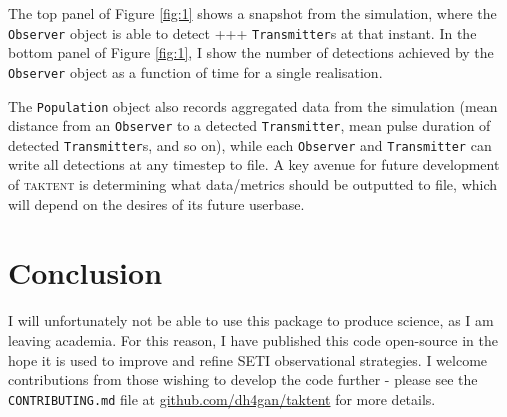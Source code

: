 \documentclass[RNAAS]{aastex62}
\begin{document}
The top panel of Figure \ref{fig:1} shows a snapshot from the simulation, where the \texttt{Observer} object is able to detect  +++ \texttt{Transmitter}s at that instant.  In the bottom panel of Figure \ref{fig:1}, I show the number of detections achieved by the \texttt{Observer} object as a function of time for a single realisation.  

The \texttt{Population} object also records aggregated data from the simulation (mean distance from an \texttt{Observer} to a detected \texttt{Transmitter}, mean pulse duration of detected \texttt{Transmitter}s, and so on), while each \texttt{Observer} and \texttt{Transmitter} can write all detections at any timestep to file.  A key avenue for future development of \textsc{taktent} is determining what data/metrics should be outputted to file, which will depend on the desires of its future userbase.

\section{Conclusion}

\noindent I will unfortunately not be able to use this package to produce science, as I am leaving academia.  For this reason, I have published this code open-source in the hope it is used to improve and refine SETI observational strategies.  I welcome contributions from those wishing to develop the code further - please see the \texttt{CONTRIBUTING.md} file at \url{github.com/dh4gan/taktent} for more details.



\acknowledgments



\end{document}
